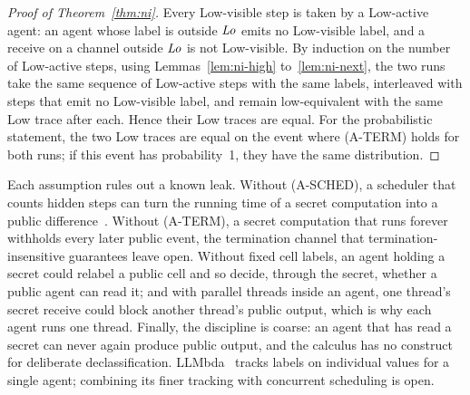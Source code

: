 \begin{proof}[Proof of Theorem~\ref{thm:ni}]
Every Low-visible step is taken by a Low-active agent: an agent whose label is outside $\mathit{Lo}$
emits no Low-visible label, and a receive on a channel outside $\mathit{Lo}$ is not Low-visible.
By induction on the number of Low-active steps, using Lemmas~\ref{lem:ni-high}
to~\ref{lem:ni-next}, the two runs take the same sequence of Low-active steps with the same
labels, interleaved with steps that emit no Low-visible label, and remain low-equivalent with
the same Low trace after each.
Hence their Low traces are equal.
For the probabilistic statement, the two Low traces are equal on the event where (A-TERM) holds
for both runs; if this event has probability~1, they have the same distribution.
\end{proof}

\noindent
Each assumption rules out a known leak.
Without (A-SCHED), a scheduler that counts hidden steps can turn the running time of a secret
computation into a public difference~\citep{volpano1999probabilistic,sabelfeld2000probabilistic}.
Without (A-TERM), a secret computation that runs forever withholds every later public event,
the termination channel that termination-insensitive guarantees leave open.
Without fixed cell labels, an agent holding a secret could relabel a public cell and so decide,
through the secret, whether a public agent can read it; and with parallel threads inside an
agent, one thread's secret receive could block another thread's public output, which is why each
agent runs one thread.
Finally, the discipline is coarse: an agent that has read a secret can never again produce
public output, and the calculus has no construct for deliberate declassification.
LLMbda~\citep{garby2026llmbda} tracks labels on individual values for a single agent; combining
its finer tracking with concurrent scheduling is open.
